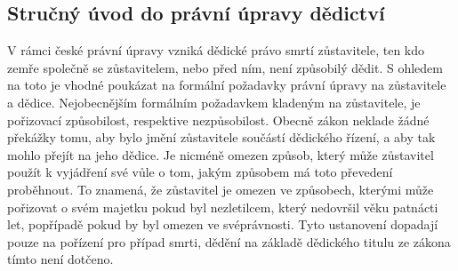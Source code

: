 \documentclass{article}
\begin{document}





\subsection{Stručný úvod do právní úpravy dědictví}

V rámci české právní úpravy vzniká dědické právo smrtí zůstavitele, ten kdo zemře společně se zůstavitelem, nebo před ním, není způsobilý dědit. S ohledem na toto je vhodné poukázat na formální požadavky právní úpravy na zůstavitele a dědice. Nejobecnějším formálním požadavkem kladeným na zůstavitele, je pořizovací způsobilost, respektive nezpůsobilost. Obecně zákon neklade žádné překážky tomu, aby bylo jmění zůstavitele součástí dědického řízení, a aby tak mohlo přejít na jeho dědice. Je nicméně omezen způsob, který může zůstavitel použít k vyjádření své vůle o tom, jakým způsobem má toto převedení proběhnout. To znamená, že zůstavitel je omezen ve způsobech, kterými může pořizovat o svém majetku pokud byl nezletilcem, který nedovršil věku patnácti let, popřípadě pokud by byl omezen ve svéprávnosti. Tyto ustanovení dopadají pouze na pořízení pro případ smrti, dědění na základě dědického titulu ze zákona tímto není dotčeno. \\
\end{document}

